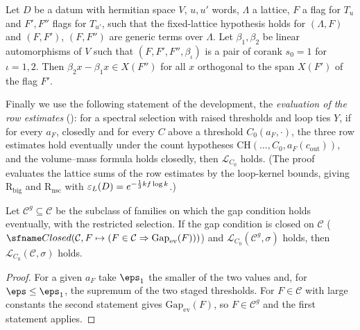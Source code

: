 \begin{theorem}\label{pf:thmS:betauniq}
Let $D$ be a datum with hermitian space $V$, $u,u'$ words, $\Lambda$ a lattice, $F$ a flag for $T_u$ and $F',F''$ flags for
$T_{u'}$, such that the fixed-lattice hypothesis holds for $(\Lambda,F)$ and $(F,F')$, $(F,F'')$ are generic terms over
$\Lambda$. Let $\beta_1,\beta_2$ be linear automorphisms of $V$ such that $(F,F',F'',\beta_\iota)$ is a pair of corank $s_0=1$
for $\iota=1,2$. Then $\beta_2x-\beta_1x\in X(F'')$ for all $x$ orthogonal to the span $X(F')$ of the flag $F'$.
\end{theorem}

Finally we use the following statement of the development, the \emph{evaluation of the row estimates}
(): for a spectral selection with raised
thresholds and loop ties $Y$, if for every $a_F$, closedly and for every $C$ above a threshold $C_{0}(a_F,\cdot)$, the three
row estimates hold eventually under the count hypotheses $\mathrm{CH}(\dots,C_0,a_F(c_{\mathrm{out}}))$, and the
volume--mass formula holds closedly, then $\mathcal{L}_{C_0}$ holds. (The proof evaluates the lattice sums of the
row estimates by the loop-kernel bounds, giving $\mathrm{R}_{\mathrm{big}}$ and $\mathrm{R}_{\mathrm{nsc}}$ with
$\varepsilon_{L}(D)=e^{-\frac13kf\log k}$.)

\begin{lemma}\label{pf:thmS:loopsub}
Let $\mathcal C^g\subseteq\mathcal C$ be the subclass of families on which the gap condition holds eventually, with the
restricted selection. If the gap condition is closed on $\mathcal C$ ($\thmSClosed(\mathcal C,F\mapsto(F\in\mathcal C
\Rightarrow\mathrm{Gap}_{\mathrm{ev}}(F)))$) and $\mathcal{L}_{C_0}(\mathcal C^g,\sigma)$ holds, then
$\mathcal{L}_{C_0}(\mathcal C,\sigma)$ holds.
\end{lemma}

\begin{proof}
For a given $a_F$ take $\eps_1$ the smaller of the two values and, for $\eps\le\eps_1$, the supremum of the two staged
thresholds. For $F\in\mathcal C$ with large constants the second statement gives $\mathrm{Gap}_{\mathrm{ev}}(F)$, so $F\in\mathcal C^g$
and the first statement applies.
\end{proof}


